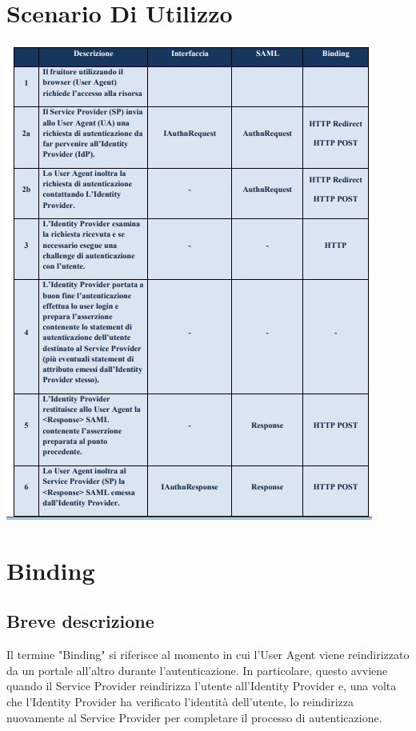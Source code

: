 \section{Scenario Di Utilizzo}
\begin{center}
	\includegraphics[scale = 1]{./res/images/ScenarioUsoSPID.PNG}
\end{center}

\pagebreak
\section{Binding}
\subsection{Breve descrizione}
Il termine "Binding" si riferisce al momento in cui l'User Agent viene reindirizzato da un portale all'altro durante l'autenticazione. 
In particolare, questo avviene quando il Service Provider reindirizza l'utente all'Identity Provider e, una volta che l'Identity 
Provider ha verificato l'identità dell'utente, lo reindirizza nuovamente al Service Provider per completare il processo di 
autenticazione.
